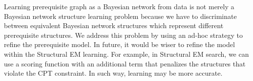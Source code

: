\documentclass{edm_template}
\begin{document}
	
	
	Learning prerequisite graph as a Bayesian network from data is not merely a Bayesian network structure learning problem 
	because we have to discriminate between equivalent Bayesian network structures which represent different prerequisite structures.
    We address this problem by using an ad-hoc strategy to refine the prerequisite model.
	In future, it would be wiser to refine the model within the Structural EM learning. 
	For example, in Structural EM search, we can use a scoring function with an additional term that penalizes the structures that violate the CPT constraint. 
	In such way, learning may be more accurate.
	
\end{document}
